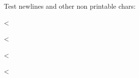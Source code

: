 \documentclass{article}
\begin{document}
Test newlines and other non printable chars:

<%

<%

<%

<%
\end{document}

